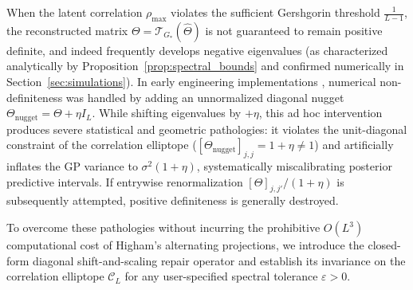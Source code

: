 \documentclass[default,sn-mathphys,Numbered]{sn-jnl}
\theoremstyle{thmstyleone}
\theoremstyle{thmstylethree}
\theoremstyle{thmstyletwo}
\begin{document}
When the latent correlation $\rho_{\max}$ violates the sufficient Gershgorin threshold $\frac{1}{L-1}$, the reconstructed matrix $\Theta = \mathcal{T}_{G_*}(\hat{\Theta})$ is not guaranteed to remain positive definite, and indeed frequently develops negative eigenvalues (as characterized analytically by Proposition~\ref{prop:spectral_bounds} and confirmed numerically in Section~\ref{sec:simulations}). In early engineering implementations \citep{saves2023high,saves2023smt}, numerical non-definiteness was handled by adding an unnormalized diagonal nugget $\Theta_{\mathrm{nugget}} = \Theta + \eta I_L$. While shifting eigenvalues by $+\eta$, this ad hoc intervention produces severe statistical and geometric pathologies: it violates the unit-diagonal constraint of the correlation elliptope ($[\Theta_{\mathrm{nugget}}]_{j, j} = 1 + \eta \neq 1$) and artificially inflates the GP variance to $\sigma^2(1+\eta)$, systematically miscalibrating posterior predictive intervals. If entrywise renormalization $[\Theta]_{j, j'} / (1+\eta)$ is subsequently attempted, positive definiteness is generally destroyed.

To overcome these pathologies without incurring the prohibitive $O(L^3)$ computational cost of Higham's alternating projections, we introduce the closed-form diagonal shift-and-scaling repair operator and establish its invariance on the correlation elliptope $\mathcal{C}_L$ for any user-specified spectral tolerance $\varepsilon > 0$.
\end{document}
